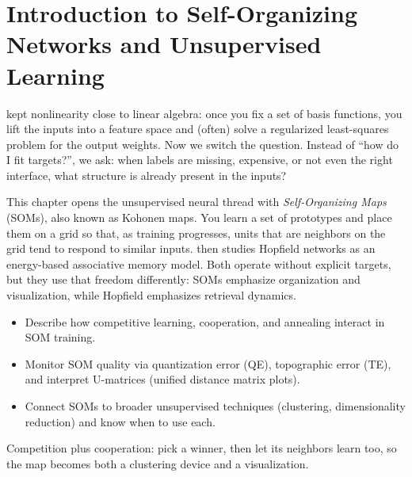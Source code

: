 \section{Introduction to Self-Organizing Networks and Unsupervised Learning}\label{chap:som}
\graphicspath{{assets/lec5/}}

 kept nonlinearity close to linear algebra: once you fix a set of basis functions, you lift the inputs into a feature space and (often) solve a regularized least-squares problem for the output weights. Now we switch the question. Instead of ``how do I fit targets?'', we ask: when labels are missing, expensive, or not even the right interface, what structure is already present in the inputs?

This chapter opens the unsupervised neural thread with \emph{Self-Organizing Maps} (SOMs), also known as Kohonen maps. You learn a set of prototypes and place them on a grid so that, as training progresses, units that are neighbors on the grid tend to respond to similar inputs.  then studies Hopfield networks as an energy\hyp{}based associative memory model. Both operate without explicit targets, but they use that freedom differently: SOMs emphasize organization and visualization, while Hopfield emphasizes retrieval dynamics.

\begin{tcolorbox}[summarybox, title={Learning Outcomes}]
\begin{itemize}
    \item Describe how competitive learning, cooperation, and annealing interact in SOM training.
    \item Monitor SOM quality via quantization error (QE), topographic error (TE), and interpret U-matrices (unified distance matrix plots).
    \item Connect SOMs to broader unsupervised techniques (clustering, dimensionality reduction) and know when to use each.
\end{itemize}
\end{tcolorbox}

\begin{tcolorbox}[summarybox, title={Design motif}]
Competition plus cooperation: pick a winner, then let its neighbors learn too, so the map becomes both a clustering device and a visualization.
\end{tcolorbox}

